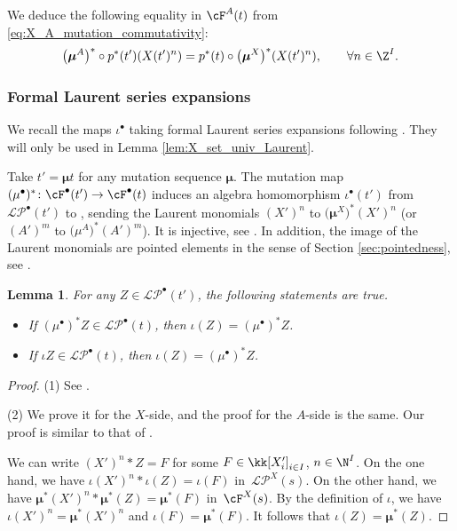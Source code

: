 \documentclass[pdftex]{sigma}
\newcommand{\LP}{{\mathcal{LP}}}
\newcommand{\seq}{\boldsymbol{\mu}}%
\newcommand{\hLP}{\widehat{\mathcal{LP}}}
\numberwithin{equation}{section}
\newtheorem{Lemma}[Theorem]{Lemma}
\begin{document}
We deduce the following equality in $\cF^A(t)$ from \eqref{eq:X_A_mutation_commutativity}:
\begin{align}\label{eq:X_A_mutation_seq_comm}
 \big(\seq^A\big)^*\circ p^*(t')(X(t')^n)=p^*(t)\circ \big(\seq^X\big)^*(X(t')^n),\qquad \forall n\in \Z^I.
\end{align}


\subsubsection*{Formal Laurent series expansions}
We recall the maps $\iota^\bullet$ taking formal Laurent series expansions following \cite[Section 3.3]{qin2019bases}. They will only be used in Lemma \ref{lem:X_set_univ_Laurent}.

Take $t'=\seq t$ for any mutation sequence $\seq$. The mutation map $(\mu^\bullet)^*\colon \cF^\bullet(t')\rightarrow \cF^\bullet(t)$ induces an algebra homomorphism $\iota^\bullet(t')$ from $\LP^\bullet(t')$ to \smash{$\hLP^\bullet(t)$}, sending the Laurent monomials $(X')^n$ to $\big(\seq^X\big)^*(X')^n$ \big(or $(A')^m$ to $\big(\mu^A\big)^* (A')^m$\big). It is injective, see \cite[Lemma 3.3.7\,(1)]{qin2019bases}. In addition, the image of the Laurent monomials are pointed elements in the sense of Section \ref{sec:pointedness}, see \cite[Lemma 3.3.6]{qin2019bases}.
\begin{Lemma}
 For any $Z\in \LP^\bullet(t')$, the following statements are true.
\begin{itemize}\itemsep=0pt
\item[$(1)$] If $(\mu^\bullet)^* Z\in \LP^\bullet(t)$, then $\iota(Z)=(\mu^\bullet)^* Z$.
\item[$(2)$] If $\iota Z\in \LP^\bullet(t)$, then $\iota(Z)=(\mu^\bullet)^* Z$.
\end{itemize}
\end{Lemma}
\begin{proof}
 (1) See \cite[Lemma 3.3.7\,(2)]{qin2019bases}.

 (2) We prove it for the $X$-side, and the proof for the $A$-side is the same. Our proof is similar to that of \cite[Lemma 3.3.7\,(2)]{qin2019bases}.

 We can write $(X')^n * Z= F$ for some $F\in \kk[X'_i]_{i\in I}$, $n\in \N^I$. On the one hand, we have $\iota(X')^n* \iota(Z)=\iota(F)$ in~$\LP^X(s)$. On the other hand, we have $\seq^*(X')^n* \seq^*(Z)=\seq^*(F)$ in~$\cF^X(s)$. By the definition of $\iota$, we have $\iota(X')^n=\seq^*(X')^n$ and $\iota(F)=\seq^*(F)$. It follows that $\iota(Z)=\seq^*(Z)$.
\end{proof}
\end{document}
